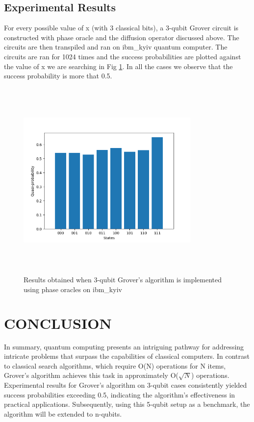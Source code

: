 \documentclass[conference]{IEEEtran}
\begin{document}
\subsection{Experimental Results}
For every possible value of x (with 3 classical bits), a 3-qubit Grover circuit is constructed with phase oracle and the diffusion operator discussed above. The circuits are then transpiled and ran on ibm\_kyiv quantum computer.
The circuits are ran for 1024 times and the success probabilities are plotted against the value of x we are searching in Fig \ref{fig:ibm_kyiv_results}. In all the cases we observe that the success probability is more that 0.5.
\begin{figure}[htbp]
	\centerline{\includegraphics[width=9cm,height=10cm,keepaspectratio]{ibm_kyiv_phase_oracles.png}}
	\caption{Results obtained when 3-qubit Grover's algorithm is implemented using phase oracles on ibm\_kyiv}
	\label{fig:ibm_kyiv_results}
\end{figure}

\section{CONCLUSION}
In summary, quantum computing presents an intriguing
pathway for addressing intricate problems that surpass the capabilities of classical computers. In contrast to classical
search algorithms, which require O(N) operations for N
items, Grover's algorithm achieves this task in approximately
O($\sqrt{N} $) operations. Experimental results for Grover's algorithm on 3-qubit cases consistently yielded success probabilities exceeding 0.5, indicating the algorithm's effectiveness in practical applications.
Subsequently,
using this 5-qubit setup as a benchmark, the algorithm will
be extended to n-qubits.
\end{document}
